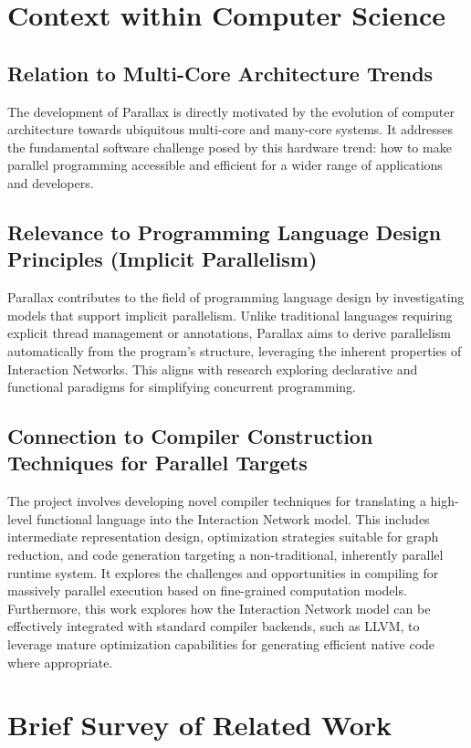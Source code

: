 \section{Context within Computer Science}

\subsection{Relation to Multi-Core Architecture Trends}
The development of Parallax is directly motivated by the evolution of computer architecture towards ubiquitous multi-core and many-core systems. It addresses the fundamental software challenge posed by this hardware trend: how to make parallel programming accessible and efficient for a wider range of applications and developers.

\subsection{Relevance to Programming Language Design Principles (Implicit Parallelism)}
Parallax contributes to the field of programming language design by investigating models that support implicit parallelism. Unlike traditional languages requiring explicit thread management or annotations, Parallax aims to derive parallelism automatically from the program's structure, leveraging the inherent properties of Interaction Networks. This aligns with research exploring declarative and functional paradigms for simplifying concurrent programming.

\subsection{Connection to Compiler Construction Techniques for Parallel Targets}
The project involves developing novel compiler techniques for translating a high-level functional language into the Interaction Network model. This includes intermediate representation design, optimization strategies suitable for graph reduction, and code generation targeting a non-traditional, inherently parallel runtime system. It explores the challenges and opportunities in compiling for massively parallel execution based on fine-grained computation models. Furthermore, this work explores how the Interaction Network model can be effectively integrated with standard compiler backends, such as LLVM, to leverage mature optimization capabilities for generating efficient native code where appropriate.

\section{Brief Survey of Related Work}

